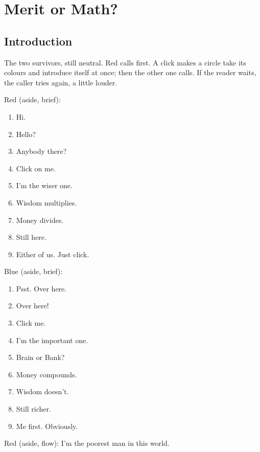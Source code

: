\section{Merit or Math?}\label{index:question-of-merit}

\subsection{Introduction}\label{act:intro}

The two survivors, still neutral. Red calls first. A click makes a circle
take its colours and introduce itself at once; then the other one calls. If
the reader waits, the caller tries again, a little louder.

Red (aside, brief):
\begin{enumerate}
  \item Hi.
  \item Hello?
  \item Anybody there?
  \item Click on me.
  \item I'm the wiser one.
  \item Wisdom multiplies.
  \item Money divides.
  \item Still here.
  \item Either of us. Just click.
\end{enumerate}

Blue (aside, brief):
\begin{enumerate}
  \item Psst. Over here.
  \item Over here!
  \item Click me.
  \item I'm the important one.
  \item Brain or Bank?
  \item Money compounds.
  \item Wisdom doesn't.
  \item Still richer.
  \item Me first. Obviously.
\end{enumerate}

Red (aside, flow): I'm the poorest man in this world.

